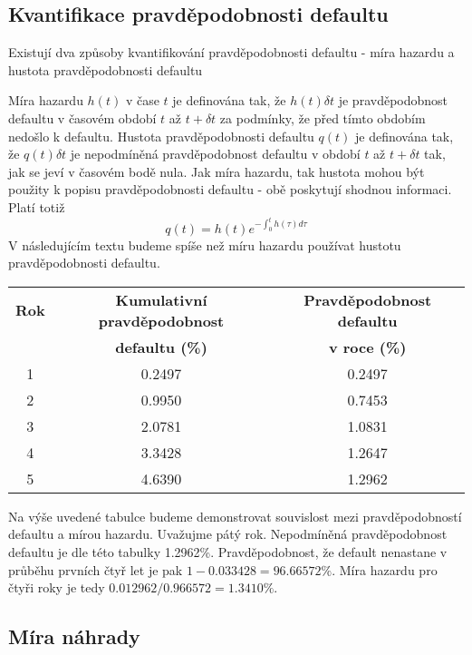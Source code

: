 \documentclass[a4paper]{book}
\begin{document}
\subsection{Kvantifikace pravděpodobnosti defaultu}

Existují dva způsoby kvantifikování pravděpodobnosti defaultu - míra hazardu a hustota pravděpodobnosti defaultu

Míra hazardu $h(t)$ v čase $t$ je definována tak, že $h(t) \delta t$ je pravděpodobnost defaultu v časovém období $t$ až $t + \delta t$ za podmínky, že před tímto obdobím nedošlo k defaultu. Hustota pravděpodobnosti defaultu $q(t)$ je definována tak, že $q(t) \delta t$ je nepodmíněná pravděpodobnost defaultu v období $t$ až $t + \delta t$ tak, jak se jeví v časovém bodě nula. Jak míra hazardu, tak hustota mohou být použity k popisu pravděpodobnosti defaultu - obě poskytují shodnou informaci. Platí totiž
\begin{equation*}
q(t) = h(t)e^{-\int^{t}_0 h(\tau) d \tau}
\end{equation*}
V následujícím textu budeme spíše než míru hazardu používat hustotu pravděpodobnosti defaultu.

\begin{center}
\begin{tabular}{c c c}
\textbf{Rok} &
\textbf{Kumulativní pravděpodobnost} & 
\textbf{Pravděpodobnost defaultu}\\
\textbf{} &
\textbf{defaultu (\%)} & 
\textbf{v roce (\%)}\\
\hline
 1 & 0.2497 & 0.2497\\
 2 & 0.9950 & 0.7453\\
 3 & 2.0781 & 1.0831\\
 4 & 3.3428 & 1.2647\\
 5 & 4.6390 & 1.2962\\
\hline 
\end{tabular}
\end{center}

Na výše uvedené tabulce budeme demonstrovat souvislost mezi pravděpodobností defaultu a mírou hazardu. Uvažujme pátý rok. Nepodmíněná pravděpodobnost defaultu je dle této tabulky 1.2962\%. Pravděpodobnost, že default nenastane v průběhu prvních čtyř let je pak $1 - 0.033428 = 96.66572\%$. Míra hazardu pro čtyři roky je tedy $0.012962/0.966572 = 1.3410\%$.

\subsection{Míra náhrady}
\end{document}
